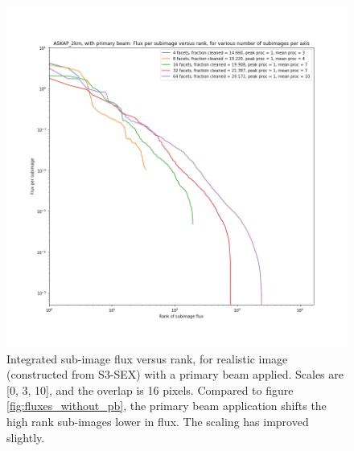 \documentclass[11pt,a4paper,variablewidth]{article}
\begin{document}
\begin{figure}[H]
  \centering
  \includegraphics[width=\textwidth]{./pngs/fluxes_with_pb_ASKAP_2km.png}
  \caption{Integrated sub-image flux versus rank, for realistic image (constructed from S3-SEX) with a primary beam applied. Scales are [0, 3, 10], and the overlap is 16 pixels. Compared to figure \ref{fig:fluxes_without_pb}, the primary beam application shifts the high rank sub-images lower in flux. The scaling has improved slightly.}
  \label{fig:fluxes_with_pb}
\end{figure}
\end{document}
